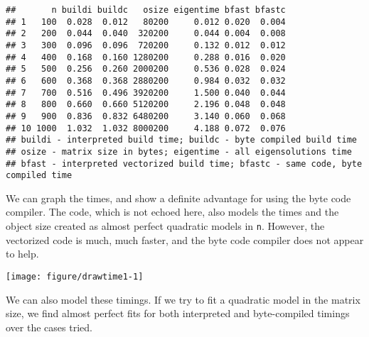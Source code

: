 \documentclass[10pt]{article}\usepackage[]{graphicx}\usepackage[]{color}
\makeatletter
\def\maxwidth{ %
  \ifdim\Gin@nat@width>\linewidth
    \linewidth
  \else
    \Gin@nat@width
  \fi
}
\newenvironment{kframe}{%
 \def\at@end@of@kframe{}%
 \ifinner\ifhmode%
  \def\at@end@of@kframe{\end{minipage}}%
  \begin{minipage}{\columnwidth}%
 \fi\fi%
 \def\FrameCommand##1{\hskip\@totalleftmargin \hskip-\fboxsep
 \colorbox{shadecolor}{##1}\hskip-\fboxsep
     \hskip-\linewidth \hskip-\@totalleftmargin \hskip\columnwidth}%
 \MakeFramed {\advance\hsize-\width
   \@totalleftmargin\z@ \linewidth\hsize
   \@setminipage}}%
 {\par\unskip\endMakeFramed%
 \at@end@of@kframe}
\newenvironment{knitrout}{}{} %
\newcommand{\code}[1]{{\tt #1}}
\makeatother
\begin{document}
\begin{knitrout}\scriptsize
{}\color{fgcolor}\begin{kframe}


{\ttfamily\noindent\itshape\color{messagecolor}{\#\# Loading required package: compiler}}\end{kframe}
\end{knitrout}

\begin{knitrout}\scriptsize
{}\color{fgcolor}\begin{kframe}
\begin{verbatim}
##       n buildi buildc   osize eigentime bfast bfastc
## 1   100  0.028  0.012   80200     0.012 0.020  0.004
## 2   200  0.044  0.040  320200     0.044 0.004  0.008
## 3   300  0.096  0.096  720200     0.132 0.012  0.012
## 4   400  0.168  0.160 1280200     0.288 0.016  0.020
## 5   500  0.256  0.260 2000200     0.536 0.028  0.024
## 6   600  0.368  0.368 2880200     0.984 0.032  0.032
## 7   700  0.516  0.496 3920200     1.500 0.040  0.044
## 8   800  0.660  0.660 5120200     2.196 0.048  0.048
## 9   900  0.836  0.832 6480200     3.140 0.060  0.068
## 10 1000  1.032  1.032 8000200     4.188 0.072  0.076
## buildi - interpreted build time; buildc - byte compiled build time
## osize - matrix size in bytes; eigentime - all eigensolutions time
## bfast - interpreted vectorized build time; bfastc - same code, byte compiled time
\end{verbatim}
\end{kframe}
\end{knitrout}

We can graph the times, and show a definite advantage for
using the byte code compiler. The code, which is not 
echoed here, also models the times and the object size
created as almost perfect quadratic models in \code{n}. However,
the vectorized code is much, much faster, and the byte code
compiler does not appear to help.

\begin{knitrout}\scriptsize
{}\color{fgcolor}
\texttt{[image: figure/drawtime1-1]} 

\end{knitrout}

We can also model these timings. If we try to fit a quadratic model in the
matrix size, we find almost perfect fits for both interpreted and byte-compiled
timings over the cases tried.
\end{document}
